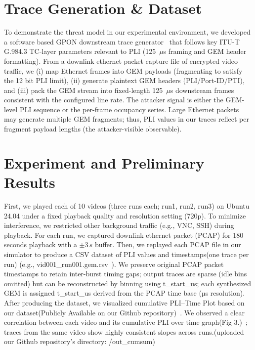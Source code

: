 \documentclass[sigconf,anonymous]{acmart}
\begin{document}
\section{Trace Generation \& Dataset}
To demonstrate the threat model in our experimental environment, we developed a software based GPON downstream trace generator~\cite{github} that follows key ITU-T G.984.3 TC-layer parameters relevant to PLI (125~$\mu$s framing and GEM header formatting). From a downlink ethernet packet capture file of encrypted video traffic, we (i) map Ethernet frames into GEM payloads (fragmenting to satisfy the 12 bit PLI limit), (ii) generate plaintext GEM headers (PLI/Port-ID/PTI), and (iii) pack the GEM stream into fixed-length 125~$\mu$s downstream frames consistent with the configured line rate. The attacker signal is either the GEM-level PLI sequence or the per-frame occupancy series. Large Ethernet packets may generate multiple GEM fragments; thus, PLI values in our traces reflect per fragment payload lengths (the attacker-visible observable).


\section{Experiment and Preliminary Results}
First, we played each of 10 videos (three runs each; run1, run2, run3) on Ubuntu 24.04 under a fixed playback quality and resolution setting (720p). To minimize interference, we restricted other background traffic (e.g., VNC, SSH) during playback. For each run, we captured downlink ethernet packet (PCAP) for 180 seconds playback with a $\pm 3\,s$ buffer. Then, we replayed each PCAP file in our simulator to produce a CSV dataset of PLI values and timestamps(one trace per run) (e.g., vid001\_run001.gem.csv~\cite{github}). We preserve original PCAP packet timestamps to retain inter-burst timing gaps; output traces are sparse (idle bins omitted) but can be reconstructed by binning using t\_start\_us; each synthesized GEM is assigned t\_start\_us derived from the PCAP time base (µs resolution). After producing the dataset, we visualized cumulative PLI--Time Plot based on our dataset(Publicly Available on our Github repository)~\cite{github}. We observed a clear correlation between each video and its cumulative PLI over time graph(Fig 3.)~\cite{github}; traces from the same video show highly consistent slopes across runs.(uploaded our Github repository's directory: \//out\_cumsum)
\end{document}
